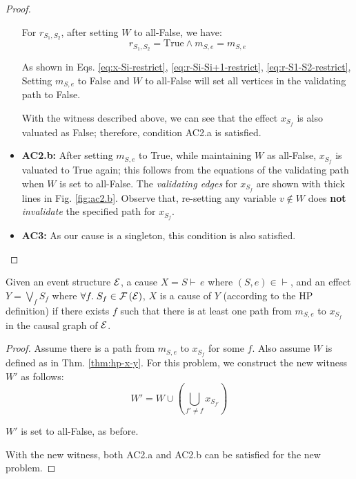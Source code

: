 \begin{proof}
\begin{itemize}
  For $r_{S_1,S_2}$, after setting $W$ to all-False, we have:
  \begin{equation}\label{eq:r-S1-S2-restrict}
    r_{S_1,S_2} = \text{True} \wedge m_{S,e} = m_{S,e}
  \end{equation}
  
  

  As shown in Eqs.
  \ref{eq:x-Si-restrict}, \ref{eq:r-Si-Si+1-restrict}, \ref{eq:r-S1-S2-restrict},
  Setting $m_{S,e}$ to False and $W$ to all-False will set all vertices
  in the validating path to False.

  With the witness described above, we can see that the effect $x_{S_f}$
  is also valuated as False; therefore, condition AC2.a is satisfied.
  
  
  \item \textbf{AC2.b:} After setting $m_{S,e}$ to True,
  while maintaining $W$ as all-False, $x_{S_f}$ is valuated to True again;
  this follows from the equations of the validating path when $W$ is set to all-False.
  The \textit{validating edges} for $x_{S_f}$ are shown with thick lines
  in Fig. \ref{fig:ac2.b}. Observe that, re-setting any variable $v \not\in W$
  does \textbf{not} \textit{invalidate} the specified path for $x_{S_f}$.

  

  \item \textbf{AC3:} As our cause is a singleton,
  this condition is also satisfied.
\end{itemize}

\end{proof}

\begin{thm}\label{thm:hp-x-disj-Y}
Given an event structure $\mathcal{E}$, a cause $X = S \vdash\,e$
where $(S, e) \in \vdash$, and an effect $Y = \bigvee_{f} S_{f}$
where $\forall f.\;S_f \in \mathcal{F} \left( \mathcal{E} \right)$, $X$ is a cause of $Y$
(according to the HP definition) if there exists $f$ such that
there is at least one path from $m_{S,e}$ to $x_{S_f}$
in the causal graph of $\mathcal{E}$.
\end{thm}

\begin{proof}
Assume there is a path from $m_{S,e}$ to $x_{S_f}$ for some $f$.
Also assume $W$ is defined as in Thm. \ref{thm:hp-x-y}. For this problem,
we construct the new witness $W'$ as follows:
\[ W' = W \cup \left( \bigcup_{f' \neq f} x_{S_{f'}} \right) \]

$W'$ is set to all-False, as before.

With the new witness, both AC2.a and AC2.b can be satisfied
for the new problem.
\end{proof}

